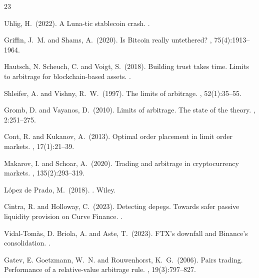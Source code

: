 \documentclass[sigconf,anonymous,natbib=false]{acmart}
\begin{document}

\scriptsize
\begin{thebibliography}{23}
\setlength{\itemsep}{1pt plus 0.2ex}

Uhlig, H.\ (2022).
\newblock A Luna-tic stablecoin crash.
.

Griffin, J.~M. and Shams, A.\ (2020).
\newblock Is Bitcoin really untethered?
, 75(4):1913--1964.

Hautsch, N. Scheuch, C. and Voigt, S.\ (2018).
\newblock Building trust takes time. Limits to arbitrage for blockchain-based
  assets.
.

Shleifer, A. and Vishny, R.~W.\ (1997).
\newblock The limits of arbitrage.
, 52(1):35--55.

Gromb, D. and Vayanos, D.\ (2010).
\newblock Limits of arbitrage. The state of the theory.
, 2:251--275.

Cont, R. and Kukanov, A.\ (2013).
\newblock Optimal order placement in limit order markets.
, 17(1):21--39.

Makarov, I. and Schoar, A.\ (2020).
\newblock Trading and arbitrage in cryptocurrency markets.
, 135(2):293--319.

L\'{o}pez de Prado, M.\ (2018).
.
\newblock Wiley.

Cintra, R. and Holloway, C.\ (2023).
\newblock Detecting depegs. Towards safer passive liquidity provision on
  Curve Finance.
.

Vidal-Tom\`{a}s, D. Briola, A. and Aste, T.\ (2023).
\newblock FTX's downfall and Binance's consolidation.
.

Gatev, E. Goetzmann, W.~N. and Rouwenhorst, K.~G.\ (2006).
\newblock Pairs trading. Performance of a relative-value arbitrage rule.
, 19(3):797--827.


\end{thebibliography}
\end{document}
